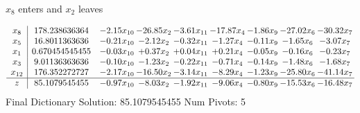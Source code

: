 \documentclass[9pt]{article}
\begin{document}
 $ x_{8} $ enters and $ x_{2} $ leaves 

 \[\begin{array}{c| c c@{\hskip 2pt} c@{\hskip 2pt} c@{\hskip 2pt} c@{\hskip 2pt} c@{\hskip 2pt} c@{\hskip 2pt} c@{\hskip 2pt} }
 x_{8}   &  178.238636364 & -2.15 x_{10} & -26.85 x_{2} & -3.61 x_{11} & -17.87 x_{4} & -1.86 x_{9} & -27.02 x_{6} & -30.32 x_{7}\\
 x_{5}   &  16.8011363636 & -0.21 x_{10} & -2.12 x_{2} & -0.32 x_{11} & -1.27 x_{4} & -0.11 x_{9} & -1.65 x_{6} & -3.07 x_{7}\\
 x_{1}   &  0.670454545455 & -0.03 x_{10} & +  0.37 x_{2} & +  0.04 x_{11} & +  0.21 x_{4} & -0.05 x_{9} & -0.16 x_{6} & -0.23 x_{7}\\
 x_{3}   &  9.01136363636 & -0.10 x_{10} & -1.23 x_{2} & -0.22 x_{11} & -0.71 x_{4} & -0.14 x_{9} & -1.48 x_{6} & -1.68 x_{7}\\
 x_{12}   &  176.352272727 & -2.17 x_{10} & -16.50 x_{2} & -3.14 x_{11} & -8.29 x_{4} & -1.23 x_{9} & -25.80 x_{6} & -41.14 x_{7}\\
\hline
z    &  85.1079545455 & -0.97 x_{10} & -8.03 x_{2} & -1.92 x_{11} & -9.06 x_{4} & -0.80 x_{9} & -15.53 x_{6} & -16.48 x_{7}\\
\end{array}\]
Final Dictionary
Solution:  85.1079545455
Num Pivots:  5
\end{document}
